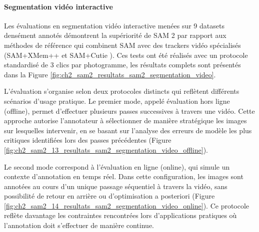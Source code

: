 \paragraph{Segmentation vidéo interactive}
Les évaluations en segmentation vidéo interactive menées sur 9 datasets densément annotés démontrent la supériorité de SAM 2 par rapport aux méthodes de référence qui combinent SAM avec des trackers vidéo spécialisés (SAM+XMem++ \cite{bekuzarov_xmem_2023} \cite{noauthor_mbzuai-metaversexmem2_2025} et SAM+Cutie \cite{cheng_putting_2024} \cite{cheng_hkchengrexcutie_2025}). Ces tests ont été réalisés avec un protocole standardisé de 3 clics par photogramme, les résultats complets sont présentés dans la Figure \ref{fig:ch2_sam2_resultats_sam2_segmentation_video}.

L'évaluation s'organise selon deux protocoles distincts qui reflètent différents scénarios d'usage pratique. Le premier mode, appelé évaluation hors ligne (offline), permet d'effectuer plusieurs passes successives à travers une vidéo. Cette approche autorise l'annotateur à sélectionner de manière stratégique les images sur lesquelles intervenir, en se basant sur l'analyse des erreurs de modèle les plus critiques identifiées lors des passes précédentes (Figure \ref{fig:ch2_sam2_13_resultats_sam2_segmentation_video_offline}).

Le second mode correspond à l'évaluation en ligne (online), qui simule un contexte d'annotation en temps réel. Dans cette configuration, les images sont annotées au cours d'un unique passage séquentiel à travers la vidéo, sans possibilité de retour en arrière ou d'optimisation a posteriori (Figure \ref{fig:ch2_sam2_14_resultats_sam2_segmentation_video_online}). Ce protocole reflète davantage les contraintes rencontrées lors d'applications pratiques où l'annotation doit s'effectuer de manière continue.

